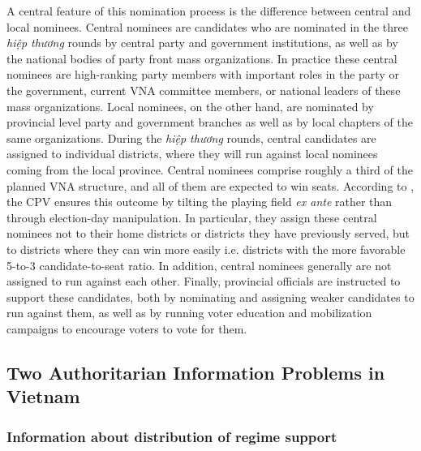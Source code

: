 \documentclass[12pt]{article}
\newcommand{\1}{\mathbbm{1}}
\begin{document}
A central feature of this nomination process is the difference between central and local nominees. Central nominees are candidates who are nominated in the three \textit{hiệp thương} rounds by central party and government institutions, as well as by the national bodies of party front mass organizations. In practice these central nominees are high-ranking party members with important roles in the party or the government, current VNA committee members, or national leaders of these mass organizations. Local nominees, on the other hand, are nominated by provincial level party and government branches as well as by local chapters of the same organizations. During the \textit{hiệp thương} rounds, central candidates are assigned to individual districts, where they will run against local nominees coming from the local province. Central nominees comprise roughly a third of the planned VNA structure, and all of them are expected to win seats. According to \cite{MaleskySchuler2011}, the CPV ensures this outcome by tilting the playing field \textit{ex ante} rather than through election-day manipulation. In particular, they assign these central nominees not to their home districts or districts they have previously served, but to districts where they can win more easily i.e. districts with the more favorable 5-to-3 candidate-to-seat ratio. In addition,  central nominees generally are not assigned to run against each other. Finally, provincial officials are instructed to support these candidates, both by nominating and assigning  weaker candidates to run against them, as well as by running voter education and mobilization campaigns to encourage voters to vote for them. 

\subsection{Two Authoritarian Information Problems in Vietnam}
\label{sec:vietnam_problems}

\subsubsection{Information about distribution of regime support}
\end{document}
